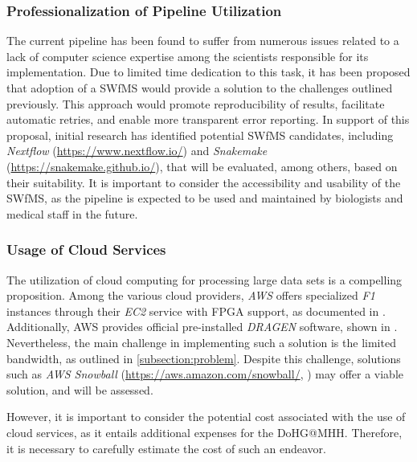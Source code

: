 \subsubsection{Professionalization of Pipeline Utilization}
The current pipeline has been found to suffer from numerous issues related to a lack of computer science expertise among the scientists responsible for its implementation. Due to limited time dedication to this task, it has been proposed that adoption of a \ac{SWfMS} would provide a solution to the challenges outlined previously. This approach would promote reproducibility of results, facilitate automatic retries, and enable more transparent error reporting. In support of this proposal, initial research has identified potential \ac{SWfMS} candidates, including \textit{Nextflow} (\url{https://www.nextflow.io/}) and \textit{Snakemake} (\url{https://snakemake.github.io/}), that will be evaluated, among others, based on their suitability. It is important to consider the accessibility and usability of the \ac{SWfMS}, as the pipeline is expected to be used and maintained by biologists and medical staff in the future.

\subsubsection{Usage of Cloud Services}
The utilization of cloud computing for processing large data sets is a compelling proposition. Among the various cloud providers, \textit{\ac{AWS}} offers specialized \textit{F1} instances through their \textit{\ac{EC2}} service with \ac{FPGA} support, as documented in \autocite{AmazonWebServices2022}. Additionally, \ac{AWS} provides official pre-installed \textit{DRAGEN} software, shown in \autocite{AmazonWebServices2023a}. Nevertheless, the main challenge in implementing such a solution is the limited bandwidth, as outlined in \autoref{subsection:problem}. Despite this challenge, solutions such as \textit{\ac{AWS} Snowball} (\url{https://aws.amazon.com/snowball/}, \autocite{AmazonWebServices2022b}) may offer a viable solution, and will be assessed.

However, it is important to consider the potential cost associated with the use of cloud services, as it entails additional expenses for the \ac{DoHG@MHH}. Therefore, it is necessary to carefully estimate the cost of such an endeavor.